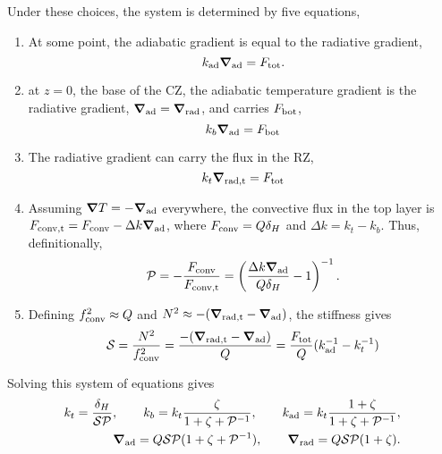 \documentclass[12pt,preprint]{article}
\renewcommand{\vec}[1]{\boldsymbol{#1}}
\newcommand{\grad}{\vec{\nabla}}
\begin{document}
Under these choices, the system is determined by five equations,
\begin{enumerate}
\item At some point, the adiabatic gradient is equal to the radiative gradient,
\begin{equation}
k_{\rm{ad}}\grad_{\rm{ad}} = F_{\rm{tot}}.
\end{equation}
\item at $z = 0$, the base of the CZ, the adiabatic temperature gradient is the radiative gradient, $\grad_{\rm{ad}} = \grad_{\rm{rad}}$, and carries $F_{\rm{bot}}$,
\begin{equation}
k_b \grad_{\rm{ad}} = F_{\rm{bot}}
\end{equation}
\item The radiative gradient can carry the flux in the RZ,
\begin{equation}
k_{t} \grad_{\rm{rad,t}} = F_{\rm{tot}}
\end{equation}
\item Assuming $\grad T = -\grad_{\rm{ad}}$ everywhere, the convective flux in the top layer is $F_{\rm{conv,t}} = F_{\rm{conv}} - \Delta k \grad_{\rm{ad}}$, where $F_{\rm{conv}} = Q \delta_H$ and $\Delta k = k_t - k_b$.
Thus, definitionally,
\begin{equation}
\mathcal{P} = -\frac{F_{\rm{conv}}}{F_{\rm{conv,t}}} = \left(\frac{\Delta k \grad_{\rm{ad}}}{Q \delta_H} - 1\right)^{-1}.
\end{equation}
\item Defining $f_{\rm{conv}}^2 \approx Q$ and $N^2 \approx -(\grad_{\rm{rad,t}} - \grad_{\rm{ad}})$, the stiffness gives
\begin{equation}
\mathcal{S} = \frac{N^2}{f_{\mathrm{conv}}^2} = \frac{-(\grad_{\rm{rad,t}} - \grad_{\rm{ad}})}{Q}
= \frac{F_{\mathrm{tot}}}{Q}(k_{\rm{ad}}^{-1} - k_t^{-1})
\end{equation}
\end{enumerate}

Solving this system of equations gives
\begin{align}
k_t = \frac{\delta_H}{\mathcal{S} \mathcal{P}},\qquad
k_b = k_t \frac{\zeta}{1 + \zeta + \mathcal{P}^{-1}},\qquad
k_{\rm{ad}} = k_t \frac{1 + \zeta}{1 + \zeta + \mathcal{P}^{-1}},\\
\grad_{\rm{ad}} = Q \mathcal{S}\mathcal{P}(1 + \zeta + \mathcal{P}^{-1}),\qquad
\grad_{\rm{rad}} = Q \mathcal{S}\mathcal{P}(1 + \zeta).
\end{align}
\end{document}
